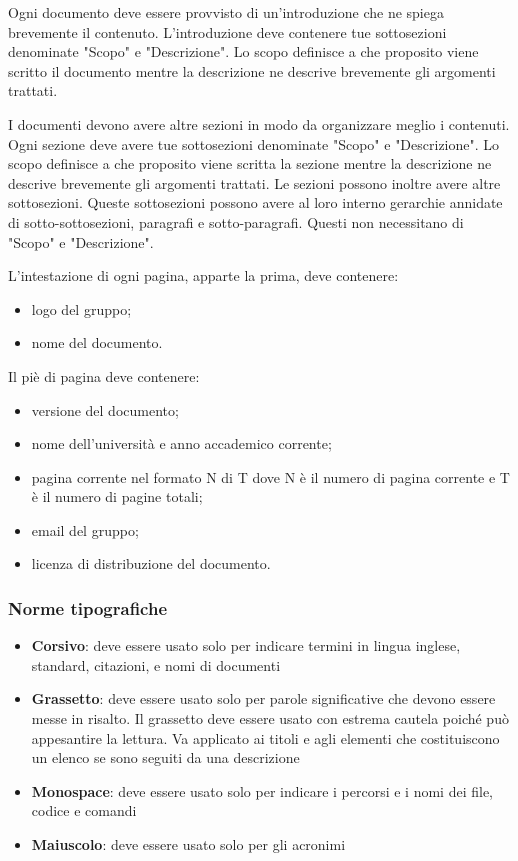 \documentclass[12pt,a4paper]{article}
\begin{document}
Ogni documento deve essere provvisto di un'introduzione che ne spiega brevemente il contenuto. L'introduzione deve contenere tue sottosezioni denominate "Scopo" e "Descrizione". Lo scopo definisce a che proposito viene scritto il documento mentre la descrizione ne descrive brevemente gli argomenti trattati.

I documenti devono avere altre sezioni in modo da organizzare meglio i contenuti. Ogni sezione deve avere tue sottosezioni denominate "Scopo" e "Descrizione". Lo scopo definisce a che proposito viene scritta la sezione mentre la descrizione ne descrive brevemente gli argomenti trattati. Le sezioni possono inoltre avere altre sottosezioni. Queste sottosezioni possono avere al loro interno gerarchie annidate di sotto-sottosezioni,  paragrafi e sotto-paragrafi. Questi non necessitano di "Scopo" e "Descrizione".

L'intestazione di ogni pagina, apparte la prima, deve contenere:
\begin{itemize}
	\item logo del gruppo;
	\item nome del documento.
\end{itemize}
Il piè di pagina deve contenere:
\begin{itemize}
	\item versione del documento;
	\item nome dell'università e anno accademico corrente;
	\item pagina corrente nel formato N di T dove N è il numero di pagina corrente e T è il numero di pagine totali;
	\item email del gruppo;
	\item licenza di distribuzione del documento.
\end{itemize}

\subsubsection{Norme tipografiche}\label{norme tipografiche}

\begin{itemize}
	\item \textbf{Corsivo}: deve essere usato solo per indicare termini in lingua inglese, standard, citazioni,  e nomi di documenti
	\item \textbf{Grassetto}: deve essere usato solo per parole significative che devono essere messe in risalto. Il grassetto deve essere usato con estrema cautela poiché può appesantire la lettura. Va applicato ai titoli e agli elementi che costituiscono un elenco se sono seguiti da una descrizione
	\item \textbf{Monospace}: deve essere usato solo per indicare i percorsi e i nomi dei file, codice e comandi
	\item \textbf{Maiuscolo}: deve essere usato solo per gli acronimi
\end{itemize}
\end{document}
